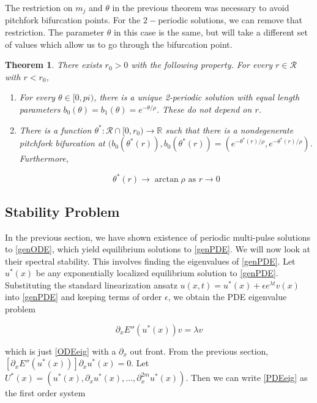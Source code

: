 \documentclass[12pt]{article}
\def\R{{\mathbb R}}
\newtheorem{theorem}{Theorem}
\begin{document}
The restriction on $m_j$ and $\theta$ in the previous theorem was necessary to avoid pitchfork bifurcation points. For the $2-$periodic solutions, we can remove that restriction. The parameter $\theta$ in this case is the same, but will take a different set of values which allow us to go through the bifurcation point.

\begin{theorem}\label{2pulsebifurcation}
There exists $r_0 > 0$ with the following property. For every $r \in \mathcal{R}$ with $r < r_0$,
\begin{enumerate}
	\item For every $\theta \in [0, pi)$, there is a unique 2-periodic solution with equal length parameters $b_0(\theta) = b_1(\theta) = e^{-\theta/\rho}$. These do not depend on $r$.

	\item There is a function $\theta^*: \mathcal{R} \cap [0, r_0) \rightarrow \R$ such that there is a nondegenerate pitchfork bifurcation at $(b_0(\theta^*(r)), b_0(\theta^*(r)) = (e^{-\theta^*(r)/\rho}, e^{-\theta^*(r)/\rho})$. Furthermore, 

	\begin{equation*}
	\theta^*(r) \rightarrow \arctan \rho \text{ as } r \rightarrow 0
	\end{equation*}

\end{enumerate}
\end{theorem}

\subsection{Stability Problem}

In the previous section, we have shown existence of periodic multi-pulse solutions to \eqref{genODE}, which yield equilibrium solutions to \eqref{genPDE}. We will now look at their spectral stability. This involves finding the eigenvalues of \eqref{genPDE}. Let $u^*(x)$ be any exponentially localized equilibrium solution to \eqref{genPDE}. Substituting the standard linearization ansatz $u(x, t) = u^*(x) + \epsilon e^{\lambda t}v(x)$ into \eqref{genPDE} and keeping terms of order $\epsilon$, we obtain the PDE eigenvalue problem

\begin{equation}\label{PDEeig}
\partial_x E''(u^*(x)) v = \lambda v
\end{equation}

which is just \eqref{ODEeig} with a $\partial_x$ out front. From the previous section, $[\partial_x E''(u^*(x))] \partial_x u^*(x) = 0$. Let $U^*(x) = (u^*(x), \partial_x u^*(x), \dots, \partial_x^{2m}u^*(x))$. Then we can write \eqref{PDEeig} as the first order system 
\end{document}

